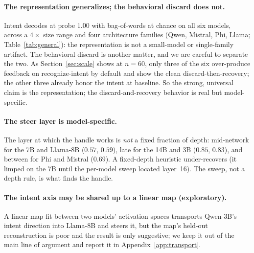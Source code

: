 \documentclass[11pt]{article}
\begin{document}
\paragraph{The representation generalizes; the behavioral discard does not.} Intent decodes at probe $1.00$
with bag-of-words at chance on all six models, across a $4{\times}$ size range and four architecture families
(Qwen, Mistral, Phi, Llama; Table~\ref{tab:general}): the representation is not a small-model or single-family
artifact. The behavioral discard is another matter, and we are careful to separate the two. As
Section~\ref{sec:scale} shows at $n{=}60$, only three of the six over-produce feedback on recognize-intent by
default and show the clean discard-then-recovery; the other three already honor the intent at baseline. So the
strong, universal claim is the representation; the discard-and-recovery behavior is real but model-specific.

\paragraph{The steer layer is model-specific.} The layer at which the handle works is \emph{not} a fixed
fraction of depth: mid-network for the 7B and Llama-8B ($0.57$, $0.59$), late for the 14B and 3B ($0.85$,
$0.83$), and between for Phi and Mistral ($0.69$). A fixed-depth heuristic under-recovers (it limped on the
7B until the per-model sweep located layer~16). The sweep, not a depth rule, is what finds the handle.

\paragraph{The intent axis may be shared up to a linear map (exploratory).} A linear map fit between two
models' activation spaces transports Qwen-3B's intent direction into Llama-8B and steers it, but the map's
held-out reconstruction is poor and the result is only suggestive; we keep it out of the main line of argument
and report it in Appendix~\ref{app:transport}.
\end{document}
